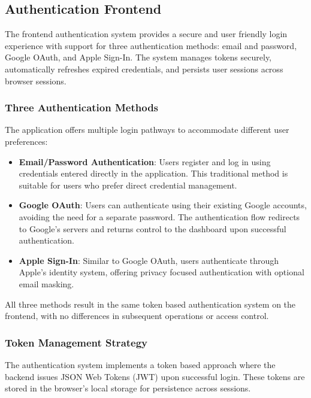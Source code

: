 \subsection{Authentication Frontend}
\label{sec:frontend_auth}

The frontend authentication system provides a secure and user friendly login experience with support for three authentication methods: email and password, Google OAuth, and Apple Sign-In. The system manages tokens securely, automatically refreshes expired credentials, and persists user sessions across browser sessions.

\subsubsection{Three Authentication Methods}

The application offers multiple login pathways to accommodate different user preferences:

\begin{itemize}
    \item \textbf{Email/Password Authentication}: Users register and log in using credentials entered directly in the application. This traditional method is suitable for users who prefer direct credential management.
    \item \textbf{Google OAuth}: Users can authenticate using their existing Google accounts, avoiding the need for a separate password. The authentication flow redirects to Google's servers and returns control to the dashboard upon successful authentication.
    \item \textbf{Apple Sign-In}: Similar to Google OAuth, users authenticate through Apple's identity system, offering privacy focused authentication with optional email masking.
\end{itemize}

All three methods result in the same token based authentication system on the frontend, with no differences in subsequent operations or access control.

\subsubsection{Token Management Strategy}

The authentication system implements a token based approach where the backend issues JSON Web Tokens (JWT) upon successful login. These tokens are stored in the browser's local storage for persistence across sessions.


